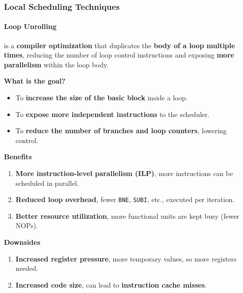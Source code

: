 \subsubsection{Local Scheduling Techniques}

\paragraph{Loop Unrolling}\label{paragraph: Loop Unrolling}

 is a \textbf{compiler optimization} that duplicates the \textbf{body of a loop multiple times}, reducing the number of loop control instructions and exposing \textbf{more parallelism} within the loop body.

\highspace
\begin{flushleft}
    \textcolor{Green3}{ \textbf{What is the goal?}}
\end{flushleft}
\begin{itemize}
    \item To \textbf{increase the size of the basic block} inside a loop.
    \item To \textbf{expose more independent instructions} to the scheduler.
    \item To \textbf{reduce the number of branches and loop counters}, lowering control.
\end{itemize}

\begin{flushleft}
    \textcolor{Green3}{ \textbf{Benefits}}
\end{flushleft}
\begin{enumerate}
    \item \textbf{More instruction-level parallelism (ILP)}, more instructions can be scheduled in parallel.
    \item \textbf{Reduced loop overhead}, fewer \texttt{BNE}, \texttt{SUBI}, etc., executed per iteration.
    \item \textbf{Better resource utilization}, more functional units are kept busy (fewer NOPs).
\end{enumerate}

\begin{flushleft}
    \textcolor{Red2}{ \textbf{Downsides}}
\end{flushleft}
\begin{enumerate}
    \item \textbf{Increased register pressure}, more temporary values, so more registers needed.
    \item \textbf{Increased code size}, can lead to \textbf{instruction cache misses}.
\end{enumerate}

